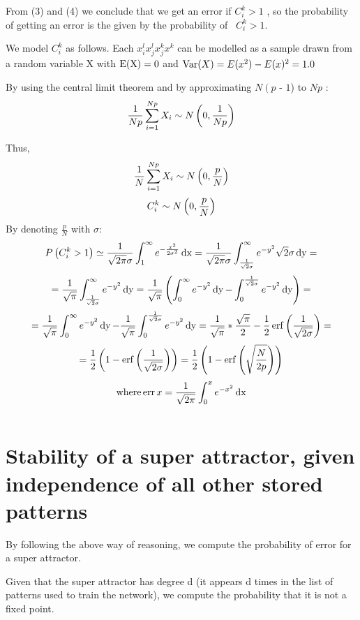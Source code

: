 From (3) and (4) we conclude that we get an error if $C_i^k > 1$ , so the
probability of getting an error is the given by the probability of \ $C_i^k >
1$.

We model $C_i^k $ as follows. Each $x^l_{i^{}} x^l_j x^k_{^{} j} x^k$ can be
modelled as a sample drawn from a random variable X with $\operatorname{E (X) = 0}$
and $\operatorname{Var} (X) = E (x^2) - E (x)^2 = 1.0$

By using the central limit theorem and by approximating $N \left( p \right.$ -
$1$) to $Np$ :
\[ \frac{1}{Np} \sum_{i = 1}^{Np} X_i \sim N \left( 0 , \frac{1}{N p}
   \right) \]


Thus,
\[ \frac{1}{N} \sum_{i = 1}^{Np} X_i \sim N \left( 0 , \frac{p}{N}
   \right) \]
\[ C^k_i \sim N \left( 0 , \frac{p}{N} \right) \]
By denoting $\frac{p}{N}$ with $\sigma :$
\[ P \left( C^k_i > 1 \right) \simeq \frac{1}{\sqrt{2 \pi} \sigma}
   \int^{\infty}_1 e^{- \frac{x^2}{2 \sigma^2}} \operatorname{dx} = \frac{1}{\sqrt{2
   \pi} \sigma} \int^{\infty}_{\frac{1}{\sqrt{2} \sigma}} e^{- y^2}
   \sqrt{2} \sigma \operatorname{dy} = \]
\[ = \frac{1}{\sqrt{\pi}} \int^{\infty}_{\frac{1}{\sqrt{2} \sigma}} e^{-
   y^2} \operatorname{dy} = \frac{1}{\sqrt{\pi}} \left( \int^{\infty}_0 e^{- y^2}
   \operatorname{dy} - \int^{\frac{1}{\sqrt{2} \sigma}}_0 e^{- y^2} \operatorname{dy} \right)
   = \]
\[ = \frac{1}{\sqrt{\pi}} \int^{\infty}_0 e^{- y^2} \operatorname{dy} -
   \frac{1}{\sqrt{\pi}} \int^{\frac{1}{\sqrt{2} \sigma}}_0 e^{- y^2}
   \operatorname{dy} = \frac{1}{\sqrt{\pi}} \ast \frac{\sqrt{\pi}}{2}  -
   \frac{1}{2} \operatorname{erf} \left( \frac{1}{\sqrt{2 \sigma}} \right) = \]
\[ = \frac{1}{2} \left( 1   - \operatorname{erf} \left( \frac{1}{\sqrt{2
   \sigma}} \right) \right) = \frac{1}{2} \left( 1   -
   {\operatorname{erf}} \left( \sqrt{\frac{N}{2 p}} \right) \right)  \]
\[ \operatorname{where} \operatorname{err} x = \frac{1}{\sqrt{2 \pi}} \int^x_0 e^{- x^2
   }_{^{^{}}} \operatorname{dx} \]

\[  \]
\[  \]
\section{Stability of a super attractor, given independence of all other
stored patterns}



By following the above way of reasoning, we compute the probability of error
for a super attractor.

Given that the super attractor has degree d (it appears d times in the list of
patterns used to train the network), we compute the probability that it is not
a fixed point.

